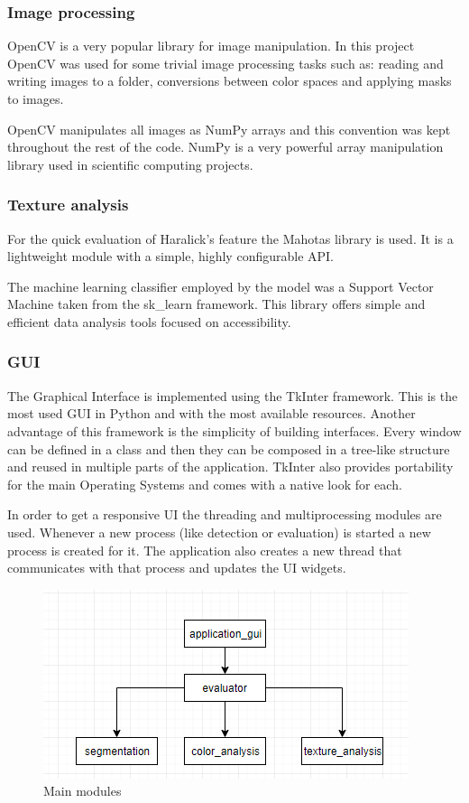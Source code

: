 \documentclass[12pt]{report}
\begin{document}
	\subsubsection{Image processing}
	OpenCV\cite{opencv} is a very popular library for image manipulation. In this project OpenCV was used for some trivial image processing tasks such as: reading and writing images to a folder, conversions between color spaces and applying masks to images. 
	
	OpenCV manipulates all images as NumPy\cite{numpy} arrays and this convention was kept throughout the rest of the code. NumPy is a very powerful array manipulation library used in scientific computing projects.
	
	\subsubsection{Texture analysis}
	For the quick evaluation of Haralick's feature the Mahotas\cite{mahotas} library is used. It is a lightweight module with a simple, highly configurable API. 
	
	The machine learning classifier employed by the model was a Support Vector Machine taken from the sk\_learn framework\cite{sklearn}. This library offers simple and efficient data analysis tools focused on accessibility.
	
	\subsubsection{GUI}
	The Graphical Interface is implemented using the TkInter framework\cite{tkinter}. This is the most used GUI in Python and with the most available resources. Another advantage of this framework is the simplicity of building interfaces. Every window can be defined in a class and then they can be composed in a tree-like structure and reused in multiple parts of the application. TkInter also provides portability for the main Operating Systems and comes with a native look for each.
	
	In order to get a responsive UI the threading and multiprocessing modules are used. Whenever a new process (like detection or evaluation) is started a new process is created for it. The application also creates a new thread that communicates with that process and updates the UI widgets.
	
	\begin{figure}[h!]
		\centering
		\includegraphics[]{design/main_modules.png}
		\caption{Main modules}
		\label{fig:main_modules}
	\end{figure}
\end{document}
